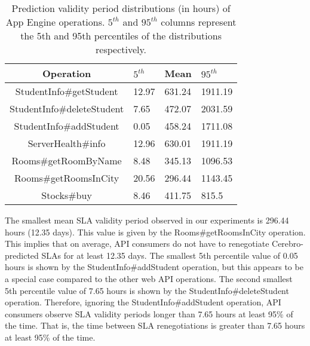 \begin{table}
\begin{center}
\begin{tabular}{|c|p{1cm}|p{1cm}|p{1cm}|}
\hline
Operation & $5^{th}$ & Mean & $95^{th}$ \\ \hline
StudentInfo\#getStudent & 12.97 & 631.24 & 1911.19 \\ \hline
StudentInfo\#deleteStudent & 7.65 & 472.07 & 2031.59 \\ \hline
StudentInfo\#addStudent & 0.05 & 458.24 & 1711.08 \\ \hline
ServerHealth\#info & 12.96 & 630.01 & 1911.19 \\ \hline
Rooms\#getRoomByName & 8.48 & 345.13 & 1096.53 \\ \hline
Rooms\#getRoomsInCity & 20.56 & 296.44 & 1143.45 \\ \hline
Stocks\#buy & 8.46 & 411.75 & 815.5 \\ \hline
\end{tabular}
\end{center}
\caption{Prediction validity period distributions (in hours) of App Engine operations.
$5^{th}$ and $95^{th}$ 
columns represent the 5th and 95th percentiles of the
distributions respectively.
\label{tab:validity_periods}
}
\vspace{-0.3in}
\end{table}

The smallest
mean SLA validity period observed in our experiments is 296.44 hours (12.35 days). This value is given by the
Rooms\#getRoomsInCity operation. 
This implies that on average, API consumers do not have to renegotiate Cerebro-predicted SLAs
for at least 12.35 days.
The smallest 5th percentile value of 0.05 hours is shown by
the StudentInfo\#addStudent operation, but this appears to be a special case compared to the other web API
operations. The second smallest 5th percentile value of 7.65 hours is shown by the 
StudentInfo\#deleteStudent operation. Therefore, ignoring the StudentInfo\#addStudent operation, API
consumers observe SLA validity periods longer than 7.65 hours at least 95\% of the time. That is, the time
between SLA renegotiations is greater than 7.65 hours at least 95\% of the time.

